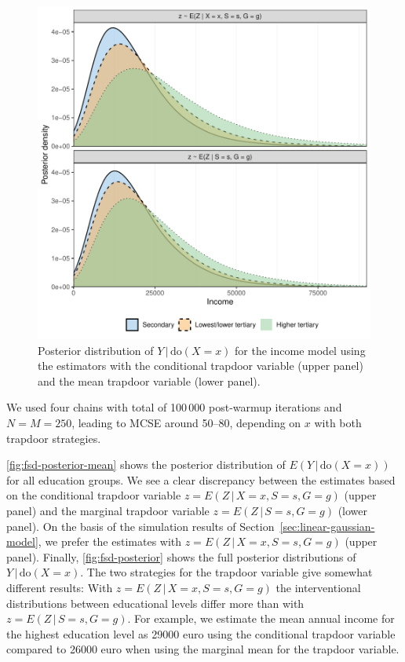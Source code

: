 \documentclass{statsoc}
\newcommand{\+}[1]{\ensuremath{\mathbf{#1}}}
\newcommand{\doo}{\textrm{do}}
\newcommand{\given}{{ \, | \, }}
\newcommand{\z}{trapdoor variable}
\begin{document}
\begin{figure}[!ht]
	\includegraphics[width=\textwidth]{figures/fsd_posterior.pdf} 
	\caption{Posterior distribution of $Y \given  \doo(X = x)$ for the income model using the estimators with the conditional \z{} (upper panel) and the mean \z{} (lower panel).}
	\label{fig:fsd-posterior}
\end{figure}
We used four chains with total of 100\,000 post-warmup iterations and $N=M=250$, leading to MCSE around 50--80, depending on $x$ with both trapdoor strategies.

\autoref{fig:fsd-posterior-mean} shows the posterior distribution of $E(Y \given \doo(X = x))$ for all education groups. We see a clear discrepancy between the estimates based on the conditional \z{} $z = E(Z \given  X = x, S = s, G = g)$ (upper panel) and the marginal \z{} $z = E(Z \given S = s, G = g)$ (lower panel). On the basis of the simulation results of Section~\ref{sec:linear-gaussian-model}, we prefer the estimates with $z = E(Z \given  X = x, S = s, G = g)$ (upper panel). Finally, \autoref{fig:fsd-posterior} shows the full posterior distributions of $Y \given \doo(X = x)$. The two strategies for the trapdoor variable give somewhat different results: With $z = E(Z \given X = x, S = s, G = g)$ the interventional distributions between educational levels differ more than with $z = E(Z \given S = s, G = g)$. For example, we estimate the mean annual income for the highest education level as 29000 euro using the conditional \z{} compared to 26000 euro when using the marginal mean for the \z{}.
\end{document}
